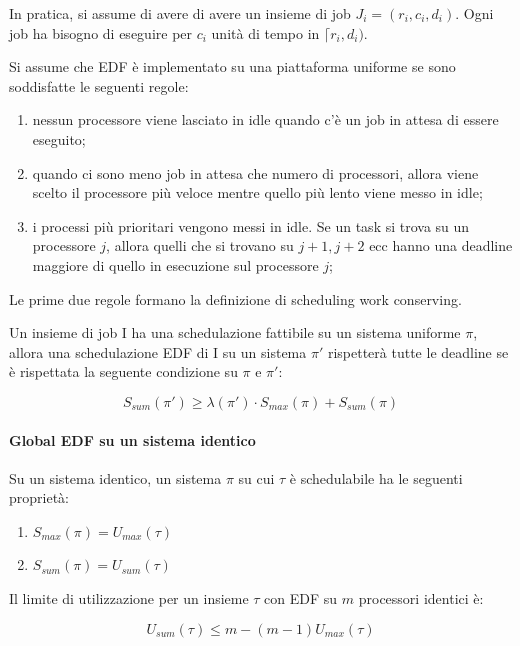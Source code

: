 \documentclass[11pt,a4paper]{report}
\begin{document}
In pratica, si assume di avere di avere un insieme di job $J_i = (r_i, c_i, d_i)$. Ogni job ha bisogno di eseguire per $c_i$ unità di tempo in $\lceil r_i, d_i)$.

Si assume che EDF è implementato su una piattaforma uniforme se sono soddisfatte le seguenti regole:
\begin{enumerate}
    \item nessun processore viene lasciato in idle quando c'è un job in attesa di essere eseguito;
    \item quando ci sono meno job in attesa che numero di processori, allora viene scelto il processore più veloce mentre quello più lento viene messo in idle;
    \item i processi più prioritari vengono messi in idle. Se un task si trova su un processore $j$, allora quelli che si trovano su $j + 1, j + 2$ ecc hanno una deadline maggiore di quello in esecuzione sul processore $j$;
\end{enumerate}

Le prime due regole formano la definizione di scheduling work conserving.

Un insieme di job I ha una schedulazione fattibile su un sistema uniforme $\pi$, allora una schedulazione EDF di I su un sistema $\pi'$ rispetterà tutte le deadline se è rispettata la seguente condizione su $\pi$ e $\pi'$:

\begin{equation}
    S_{sum}(\pi') \geq \lambda(\pi') \cdot S_{max}(\pi) + S_{sum}(\pi)
\end{equation}

\paragraph{Global EDF su un sistema identico}

Su un sistema identico, un sistema $\pi$ su cui $\tau$ è schedulabile ha le seguenti proprietà:

\begin{enumerate}
    \item $S_{max}(\pi) = U_{max}(\tau)$
    \item $S_{sum}(\pi) = U_{sum}(\tau)$
\end{enumerate}

Il limite di utilizzazione per un insieme $\tau$ con EDF su $m$ processori identici è:

\begin{equation}
    U_{sum}(\tau) \leq m - (m-1)U_{max}(\tau)
\end{equation}
\end{document}
